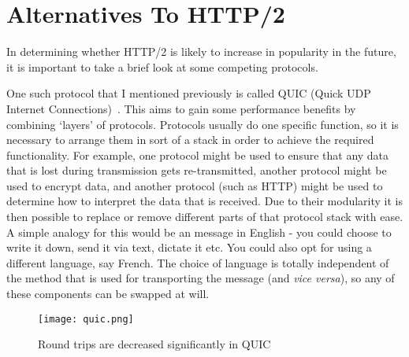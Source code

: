 \section{Alternatives To HTTP/2}

In determining whether HTTP/2 is likely to increase in popularity in the future, it is important to take a brief look at some competing protocols.

One such protocol that I mentioned previously is called QUIC (Quick UDP Internet Connections)~\cite{quic}. This aims to gain some performance benefits by combining `layers' of protocols. Protocols usually do one specific function, so it is necessary to arrange them in sort of a stack in order to achieve the required functionality. For example, one protocol might be used to ensure that any data that is lost during transmission gets re-transmitted, another protocol might be used to encrypt data, and another protocol (such as HTTP) might be used to determine how to interpret the data that is received. Due to their modularity it is then possible to replace or remove different parts of that protocol stack with ease. A simple analogy for this would be an message in English \hyp{} you could choose to write it down, send it via text, dictate it etc. You could also opt for using a different language, say French. The choice of language is totally independent of the method that is used for transporting the message (and \textit{vice versa}), so any of these components can be swapped at will.

\begin{figure}
	\centering
	\texttt{[image: quic.png]}
	\caption{Round trips are decreased significantly in QUIC}
	\label{fig:quic}
\end{figure}

